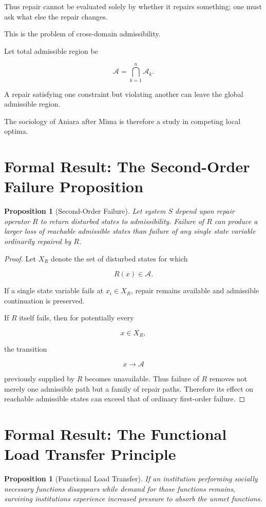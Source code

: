 \documentclass[11pt,oneside]{book}
\newtheorem{proposition}[theorem]{Proposition}
\theoremstyle{definition}
\theoremstyle{remark}
\newcommand{\A}{\mathcal{A}}
\begin{document}
Thus repair cannot be evaluated solely by whether it repairs something; one must ask what else the repair changes.

This is the problem of cross-domain admissibility.

Let total admissible region be

\[
\A
=
\bigcap_{k=1}^{n}
\A_k.
\]

A repair satisfying one constraint but violating another can leave the global admissible region.

The sociology of Aniara after Mima is therefore a study in competing local optima.

\section{Formal Result: The Second-Order Failure Proposition}

\begin{proposition}[Second-Order Failure]
Let system \(S\) depend upon repair operator \(R\) to return disturbed states to admissibility. Failure of \(R\) can produce a larger loss of reachable admissible states than failure of any single state variable ordinarily repaired by \(R\).
\end{proposition}

\begin{proof}
Let \(X_R\) denote the set of disturbed states for which

\[
R(x)\in\A.
\]

If a single state variable fails at \(x_i\in X_R\), repair remains available and admissible continuation is preserved.

If \(R\) itself fails, then for potentially every

\[
x\in X_R,
\]

the transition

\[
x\rightarrow\A
\]

previously supplied by \(R\) becomes unavailable. Thus failure of \(R\) removes not merely one admissible path but a family of repair paths. Therefore its effect on reachable admissible states can exceed that of ordinary first-order failure.
\end{proof}

\section{Formal Result: The Functional Load Transfer Principle}

\begin{proposition}[Functional Load Transfer]
If an institution performing socially necessary functions disappears while demand for those functions remains, surviving institutions experience increased pressure to absorb the unmet functions.
\end{proposition}
\end{document}
